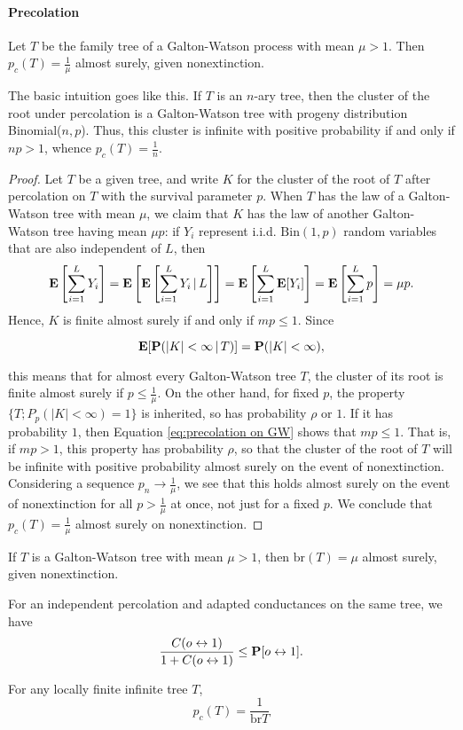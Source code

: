 \paragraph{Precolation}
\begin{theorem}
    Let \(T\) be the family tree of a Galton-Watson process with mean \(\mu > 1\). Then \(p_c(T) = \frac{1}{\mu}\) almost surely, given nonextinction.
\end{theorem}
The basic intuition goes like this.
If \(T\) is an \(n\)-ary tree, then the cluster of the root under percolation is a Galton-Watson tree with progeny distribution Binomial(\(n, p\)). Thus, this cluster is infinite with positive probability if and only if \(np > 1\), whence \(p_c(T) = \frac{1}{n}\).
\begin{proof}
    Let \(T\) be a given tree, and write \(K\) for the cluster of the root of \(T\) after percolation on \(T\) with the survival parameter \(p\). 
    When \(T\) has the law of a Galton-Watson tree with mean \(\mu\), we claim that \(K\) has the law of another Galton-Watson tree having mean \(\mu p\): 
    if \(Y_i\) represent i.i.d. \(\text{Bin}(1, p)\) random variables that are also independent of \(L\), then
\[
\mathbf{E}\left[\sum_{i=1}^{L} Y_i\right] = \mathbf{E}\left[\mathbf{E}\left[\sum_{i=1}^{L} Y_i \,|\, L\right]\right] = \mathbf{E}\left[\sum_{i=1}^{L} \mathbf{E}[Y_i]\right] = \mathbf{E}\left[\sum_{i=1}^{L} p\right] = \mu p.
\]
Hence, \(K\) is finite almost surely if and only if \(mp \leq 1\). Since

\begin{equation}\label{eq:precolation on GW}
    \mathbf{E}[\mathbf{P}(|K| < \infty \,|\, T)] = \mathbf{P}(|K| < \infty),
\end{equation}
    
this means that for almost every Galton-Watson tree \(T\), the cluster of its root is finite almost surely if \(p \leq \frac{1}{\mu}\). 
On the other hand, for fixed \(p\), the property \(\{T; P_p(|K| < \infty) = 1\}\) is inherited, so has probability \(\rho\) or \(1\). 
If it has probability \(1\), then Equation \eqref{eq:precolation on GW} shows that \(mp \leq 1\). 
That is, if \(mp > 1\), this property has probability \(\rho\), so that the cluster of the root of \(T\) will be infinite with positive probability almost surely on the event of nonextinction. 
Considering a sequence \(p_n \to \frac{1}{\mu}\), we see that this holds almost surely on the event of nonextinction for all \(p > \frac{1}{\mu}\) at once, not just for a fixed \(p\). 
We conclude that \(p_c(T) = \frac{1}{\mu}\) almost surely on nonextinction.

\end{proof}
\begin{corollary}
    If \(T\) is a Galton-Watson tree with mean \(\mu > 1\), then \(\text{br}(T) = \mu\) almost surely, given nonextinction.
\end{corollary}
\begin{theorem}
    For an independent percolation and adapted conductances on the same tree, we have
\[
\frac{C(o \leftrightarrow 1)}{1 + C(o \leftrightarrow 1)} \leq \mathbf{P}[o \leftrightarrow 1].
\]

\end{theorem}

\begin{corollary}
    For any locally finite infinite tree $T$, 
    \[p_c(T)=\frac{1}{\text{br}T}\]
\end{corollary}

